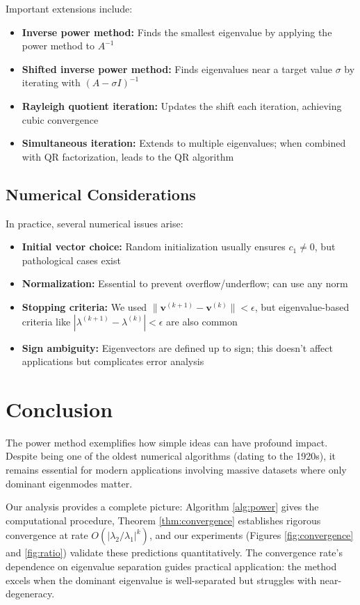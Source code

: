 \documentclass[11pt,a4paper]{article}
\begin{document}
Important extensions include:
\begin{itemize}
    \item \textbf{Inverse power method:} Finds the smallest eigenvalue by applying the power method to $A^{-1}$
    \item \textbf{Shifted inverse power method:} Finds eigenvalues near a target value $\sigma$ by iterating with $(A - \sigma I)^{-1}$
    \item \textbf{Rayleigh quotient iteration:} Updates the shift each iteration, achieving cubic convergence \cite{trefethen1997}
    \item \textbf{Simultaneous iteration:} Extends to multiple eigenvalues; when combined with QR factorization, leads to the QR algorithm
\end{itemize}

\subsection{Numerical Considerations}

In practice, several numerical issues arise:
\begin{itemize}
    \item \textbf{Initial vector choice:} Random initialization usually ensures $c_1 \neq 0$, but pathological cases exist
    \item \textbf{Normalization:} Essential to prevent overflow/underflow; can use any norm
    \item \textbf{Stopping criteria:} We used $\|\mathbf{v}^{(k+1)} - \mathbf{v}^{(k)}\| < \epsilon$, but eigenvalue-based criteria like $|\lambda^{(k+1)} - \lambda^{(k)}| < \epsilon$ are also common
    \item \textbf{Sign ambiguity:} Eigenvectors are defined up to sign; this doesn't affect applications but complicates error analysis
\end{itemize}

\section{Conclusion}

The power method exemplifies how simple ideas can have profound impact. Despite being one of the oldest numerical algorithms (dating to the 1920s), it remains essential for modern applications involving massive datasets where only dominant eigenmodes matter.

Our analysis provides a complete picture: Algorithm \ref{alg:power} gives the computational procedure, Theorem \ref{thm:convergence} establishes rigorous convergence at rate $O(|\lambda_2/\lambda_1|^k)$, and our experiments (Figures \ref{fig:convergence} and \ref{fig:ratio}) validate these predictions quantitatively. The convergence rate's dependence on eigenvalue separation guides practical application: the method excels when the dominant eigenvalue is well-separated but struggles with near-degeneracy.
\end{document}
